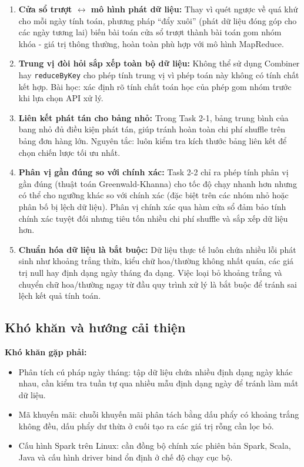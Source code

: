 \begin{enumerate}
    \item \textbf{Cửa sổ trượt $\leftrightarrow$ mô hình phát dữ liệu:} Thay vì quét ngược về quá khứ cho mỗi ngày tính toán, phương pháp ``đẩy xuôi'' (phát dữ liệu đóng góp cho các ngày tương lai) biến bài toán cửa sổ trượt thành bài toán gom nhóm khóa - giá trị thông thường, hoàn toàn phù hợp với mô hình MapReduce.

    \item \textbf{Trung vị đòi hỏi sắp xếp toàn bộ dữ liệu:} Không thể sử dụng Combiner hay \texttt{reduceByKey} cho phép tính trung vị vì phép toán này không có tính chất kết hợp. Bài học: xác định rõ tính chất toán học của phép gom nhóm trước khi lựa chọn API xử lý.

    \item \textbf{Liên kết phát tán cho bảng nhỏ:} Trong Task 2-1, bảng trung bình của bang nhỏ đủ điều kiện phát tán, giúp tránh hoàn toàn chi phí shuffle trên bảng đơn hàng lớn. Nguyên tắc: luôn kiểm tra kích thước bảng liên kết để chọn chiến lược tối ưu nhất.

    \item \textbf{Phân vị gần đúng so với chính xác:} Task 2-2 chỉ ra phép tính phân vị gần đúng (thuật toán Greenwald-Khanna) cho tốc độ chạy nhanh hơn nhưng có thể cho ngưỡng khác so với chính xác (đặc biệt trên các nhóm nhỏ hoặc phân bố bị lệch dữ liệu). Phân vị chính xác qua hàm cửa sổ đảm bảo tính chính xác tuyệt đối nhưng tiêu tốn nhiều chi phí shuffle và sắp xếp dữ liệu hơn.

    \item \textbf{Chuẩn hóa dữ liệu là bắt buộc:} Dữ liệu thực tế luôn chứa nhiều lỗi phát sinh như khoảng trắng thừa, kiểu chữ hoa/thường không nhất quán, các giá trị null hay định dạng ngày tháng đa dạng. Việc loại bỏ khoảng trắng và chuyển chữ hoa/thường ngay từ đầu quy trình xử lý là bắt buộc để tránh sai lệch kết quả tính toán.
\end{enumerate}

\subsection{Khó khăn và hướng cải thiện}

\textbf{Khó khăn gặp phải:}
\begin{itemize}
    \item Phân tích cú pháp ngày tháng: tập dữ liệu chứa nhiều định dạng ngày khác nhau, cần kiểm tra tuần tự qua nhiều mẫu định dạng ngày để tránh làm mất dữ liệu.
    \item Mã khuyến mãi: chuỗi khuyến mãi phân tách bằng dấu phẩy có khoảng trắng không đều, dấu phẩy dư thừa ở cuối tạo ra các giá trị rỗng cần lọc bỏ.
    \item Cấu hình Spark trên Linux: cần đồng bộ chính xác phiên bản Spark, Scala, Java và cấu hình driver bind ổn định ở chế độ chạy cục bộ.
\end{itemize}

